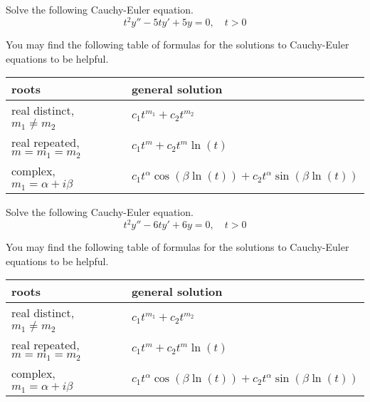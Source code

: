 \fi 

\ifnum {}
\question[8] Solve the following Cauchy-Euler equation. 
$$t^2y'' - 5ty' + 5y = 0, \quad t > 0$$

You may find the following table of formulas for the solutions to Cauchy-Euler equations to be helpful. 

\begin{center}
    \begin{tabular}{ p{6.2cm} p{6cm} }
        roots &  general solution 
        \\[2pt] \hline 
        real distinct, $m_1 \ne m_2$ &  $c_1 t^{m_1} + c_2 t^{m_2}$\\       
        real repeated, $m = m_1 = m_2$ & $c_1 t^{m} + c_2 t^m \ln(t)$\\
        complex, $m_1 = \alpha + i \beta$ & $c_1t^{\alpha}\cos(\beta \ln(t)) + c_2t^{\alpha}\sin(\beta \ln (t))$\\[2pt] \hline
    \end{tabular}    
\end{center}

\fi 

\ifnum {}
\question[8] Solve the following Cauchy-Euler equation. 
$$t^2y'' - 6ty' + 6y = 0, \quad t > 0$$

You may find the following table of formulas for the solutions to Cauchy-Euler equations to be helpful. 

\begin{center}
    \begin{tabular}{ p{6.2cm} p{6cm} }
        roots &  general solution 
        \\[2pt] \hline 
        real distinct, $m_1 \ne m_2$ &  $c_1 t^{m_1} + c_2 t^{m_2}$\\       
        real repeated, $m = m_1 = m_2$ & $c_1 t^{m} + c_2 t^m \ln(t)$\\
        complex, $m_1 = \alpha + i \beta$ & $c_1t^{\alpha}\cos(\beta \ln(t)) + c_2t^{\alpha}\sin(\beta \ln (t))$\\[2pt] \hline
    \end{tabular}    
\end{center}

\fi 

